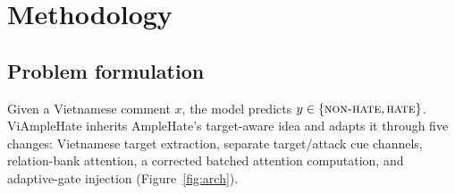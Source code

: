 \documentclass[11pt]{article}
\begin{document}
\section{Methodology}

\subsection{Problem formulation}
Given a Vietnamese comment $x$, the model predicts $y \in \{\textsc{non-hate}, \textsc{hate}\}$. ViAmpleHate inherits AmpleHate's target-aware idea and adapts it through five changes: Vietnamese target extraction, separate target/attack cue channels, relation-bank attention, a corrected batched attention computation, and adaptive-gate injection (Figure~\ref{fig:arch}).

\end{document}
